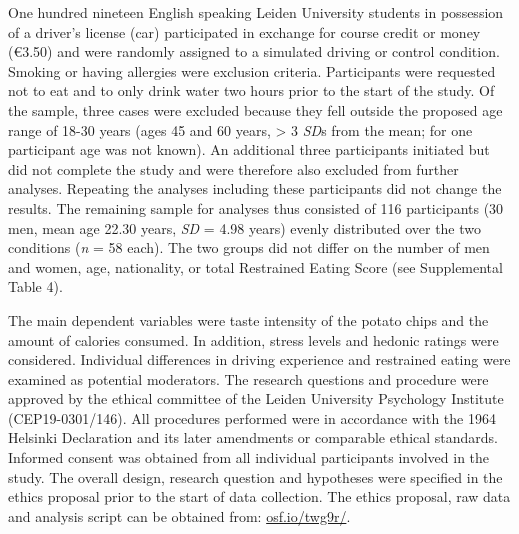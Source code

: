 \documentclass[authordate, empirical]{jote-new-article}
\begin{document}
One hundred nineteen English speaking Leiden University students in possession of a driver’s license (car) participated in exchange for course credit or money (€3.50) and were randomly assigned to a simulated driving or control condition. Smoking or having allergies were exclusion criteria. Participants were requested not to eat and to only drink water two hours prior to the start of the study. Of the sample, three cases were excluded because they fell outside the proposed age range of 18-30 years (ages 45 and 60 years, > 3 \emph{SD}s from the mean; for one participant age was not known). An additional three participants initiated but did not complete the study and were therefore also excluded from further analyses. Repeating the analyses including these participants did not change the results. The remaining sample for analyses thus consisted of 116 participants (30 men, mean age 22.30 years, \emph{SD }= 4.98 years) evenly distributed over the two conditions (\emph{n }= 58 each). The two groups did not differ on the number of men and women, age, nationality, or total Restrained Eating Score (see Supplemental Table 4).



The main dependent variables were taste intensity of the potato chips and the amount of calories consumed. In addition, stress levels and hedonic ratings were considered. Individual differences in driving experience and restrained eating were examined as potential moderators. The research questions and procedure were approved by the ethical committee of the Leiden University Psychology Institute (CEP19-0301/146). All procedures performed were in accordance with the 1964 Helsinki Declaration and its later amendments or comparable ethical standards. Informed consent was obtained from all individual participants involved in the study. The overall design, research question and hypotheses were specified in the ethics proposal prior to the start of data collection. The ethics proposal, raw data and analysis script can be obtained from: \href{https://osf.io/twg9r/}{osf.io/twg9r/}.
\end{document}
